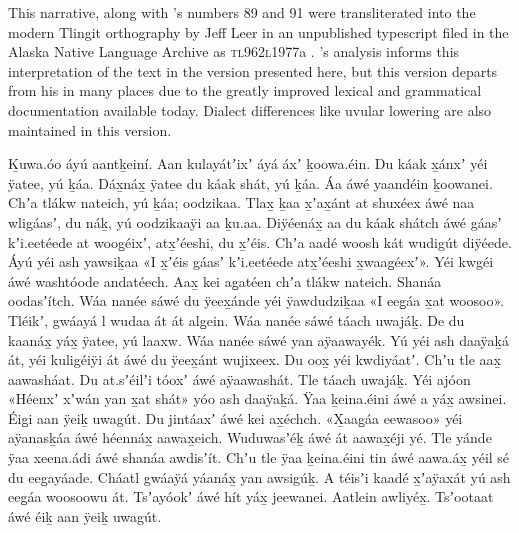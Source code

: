 This narrative, along with \citeauthor{swanton:1909}’s numbers 89 and 91 were transliterated into the modern Tlingit orthography by Jeff Leer in an unpublished typescript filed in the Alaska Native Language Archive as \textsc{\MakeLowercase{TL962L1977}}a \parencite{leer:1977}.
\citeauthor{leer:1977}’s analysis informs this interpretation of the text in the version presented here, but this version departs from his  in many places due to the greatly improved lexical and grammatical documentation available today.
Dialect differences like uvular lowering are also maintained in this version.

\clearpage
\begin{pairs}
\begin{Leftside}
\beginnumbering
\pstart
{}Ḵuwa.óo áyú aantḵeiní.
Aan kulayátʼixʼ áyá áxʼ ḵoowa.éin.
Du káak x̱ánxʼ yéi ÿatee, yú ḵáa.
Dáx̱náx̱ ÿatee du káak shát, yú ḵáa.
Áa áwé yaandéin ḵoowanei.
Chʼa tlákw nateich, yú ḵáa;
oodzikaa.
Tlax̱ ḵaa x̱ʼax̱ánt at shuxéex áwé naa wligáasʼ, du náḵ, yú oodzikaaÿi aa ḵu.aa.
Diÿée\-náx̱ aa du káak shátch áwé gáasʼ kʼi.eetéede at woog̱éixʼ, atx̱ʼéeshi, du x̱ʼéis.
Chʼa aadé woosh kát wudigút diÿéede.
Áyú yéi ash yawsiḵaa
«\!I x̱ʼéis gáasʼ kʼi.eetéede atx̱ʼéeshi x̱waag̱éexʼ\!».
Yéi kwgéi áwé washtóode andatéech.
Aax̱ kei ag̱atéen chʼa tlákw nateich.
Shanáa oo\-dasʼítch.
\pend
\pstart
{}Wáa nanée sáwé du ÿeex̱ánde yéi ÿawdudziḵaa
«\!I eeg̱áa x̱at woosoo\!».
Tléikʼ, gwáayá l wudaa át át alg̱ein.
Wáa nanée sáwé táach uwajáḵ.
De du kaanáx̱ yáx̱ ÿatee, yú laaxw.
Wáa nanée sáwé yan aÿaawayék.
Yú yéi ash daaÿaḵá át, yéi kuligéiÿi át áwé du ÿeex̱ánt wujixeex.
Du oox̱ yéi kwdiyáatʼ.
Chʼu tle aax̱ aawasháat.
Du at.sʼéilʼi tóoxʼ áwé aÿaawashát.
Tle táach uwajáḵ.
Yéi ajóon «\!Héenxʼ xʼwán yan x̱at shát\!» yóo ash daaÿaḵá.
Ÿaa ḵeina.éini áwé a yáx̱ awsinei.
Éig̱i aan ÿeiḵ uwagút.
Du jintáaxʼ áwé kei ax̱échch.
«\!X̱aag̱áa eewasoo\!» yéi aÿanasḵáa áwé héennáx̱ aawax̱eich.
Wuduwasʼéḵ áwé át aawax̱éji yé.
Tle yánde ÿaa xeena.ádi áwé shanáa awdisʼít.
Chʼu tle ÿaa ḵeina.éini tin áwé aawa.áx̱ yéil sé du eeg̱ayáade.
Cháatl gwáaÿá yáanáx̱ yan awsigúḵ.
A téisʼi kaadé x̱ʼaÿaxát yú ash eeg̱áa woosoowu át.
\pend
\pstart
{}Tsʼayóokʼ áwé hít yáx̱ jeewanei.
Aatlein awliyéx̱.
Tsʼootaat áwé éiḵ aan ÿeiḵ uwagút.

\end{Leftside}
\end{pairs}
